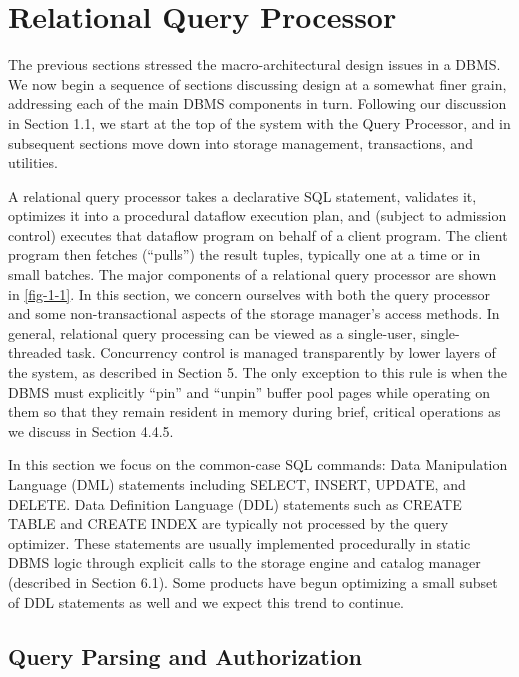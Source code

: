 \documentclass[b5paper,11pt,twoside,openright]{book}
\begin{document}
\hypertarget{relational-query-processor}{%
\chapter{Relational Query Processor}\label{relational-query-processor}}

The previous sections stressed the macro-architectural design issues in
a DBMS. We now begin a sequence of sections discussing design at a
somewhat finer grain, addressing each of the main DBMS components in
turn. Following our discussion in Section 1.1, we start at the top of
the system with the Query Processor, and in subsequent sections move
down into storage management, transactions, and utilities.

A relational query processor takes a declarative SQL statement,
validates it, optimizes it into a procedural dataflow execution plan,
and (subject to admission control) executes that dataflow program on
behalf of a client program. The client program then fetches (``pulls'')
the result tuples, typically one at a time or in small batches. The
major components of a relational query processor are shown in \autoref{fig-1-1}.
In this section, we concern ourselves with both the query processor
and some non-transactional aspects of the storage manager's access
methods. In general, relational query processing can be viewed as a
single-user, single-threaded task. Concurrency control is managed
transparently by lower layers of the system, as described in Section 5.
The only exception to this rule is when the DBMS must explicitly ``pin''
and ``unpin'' buffer pool pages while operating on them so that
they remain resident in memory during brief, critical operations as we
discuss in Section 4.4.5.

In this section we focus on the common-case SQL commands: Data
Manipulation Language (DML) statements including SELECT, INSERT, UPDATE,
and DELETE. Data Definition Language (DDL) statements such as CREATE
TABLE and CREATE INDEX are typically not processed by the query
optimizer. These statements are usually implemented procedurally in
static DBMS logic through explicit calls to the storage engine and
catalog manager (described in Section 6.1). Some products have begun
optimizing a small subset of DDL statements as well and we expect this
trend to continue.

\hypertarget{query-parsing-and-authorization}{%
\section{Query Parsing and
Authorization}\label{query-parsing-and-authorization}}
\end{document}
